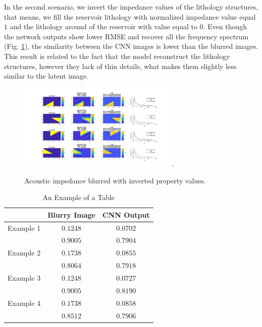 \documentclass[conference,compsoc]{IEEEtran}
\begin{document}
In the second scenario, we invert the impedance values of the lithology structures, that means,
we fill the reservoir lithology with normalized impedance value equal $1$ and the lithology
around of the reservoir with value equal to $0$.
Even though the network outputs show lower RMSE and recover all the frequency spectrum (Fig. \ref{fig_scenario6}), the similarity
between the CNN images is lower than the blurred images.
This result is related to the fact that the model reconstruct the lithology structures, however they lack of thin
details, what makes them slightly less similar to the latent image.
\begin{figure}[!t]
\centering
\includegraphics[width=3.0in]{Figs/Caso6}
\DeclareGraphicsExtensions.
\caption{Acoustic impedance blurred with inverted property values.}
\label{fig_scenario6}
\end{figure}

\begin{table}[!t]
\renewcommand{\arraystretch}{1.3}
\caption{An Example of a Table}
\label{table_caso_2}
\centering
\begin{tabular}{|c||c||c|}
\hline
 & Blurry Image & CNN Output \\
\hline
Example 1 & $0.1248$ & $0.0702$\\
\hline
	  & $0.9005$ & $0.7904$\\
\hline
Example 2 & $0.1738$ & $0.0855$ \\
\hline
	  & $0.8064$ & $0.7918$\\
\hline
Example 3 & $0.1248$ & $0.0727$\\
\hline
	  & $0.9005$ & $0.8190$\\
\hline
Example 4 & $0.1738$ & $0.0858$\\
\hline
	  & $0.8512$ & $0.7906$\\
\hline
\end{tabular}
\end{table}
\end{document}
